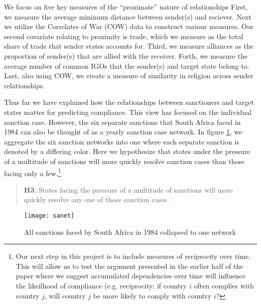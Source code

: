 We focus on five key measures of the ``proximate'' nature of relationships First, we measure the average minimum distance between sender(s) and reciever. Next we utilize the Correlates of War (COW) data to construct variour measures. Our second covariate relating to proximity is trade, which we measure as the total share of trade that sender states accounts for. Third, we measure alliances as the proportion of sender(s) that are allied with the receiver. Forth, we measure the average number of common IGOs that the sender(s) and target state belong to. Last, also using COW, we create a measure of similarity in religion across sender relationships.
  
Thus far we have explained how the relationships between sanctioners and target states matter for predicting compliance. This view has focused on the individual sanction case. However, the six separate sanctions that South Africa faced in 1984 can also be thought of as a yearly sanction case network. In figure \ref{fig:sanet}, we aggregate the six sanction networks into one where each separate sanction is denoted by a differing color. Here we hypothesize that states under the pressure of a multitude of sanctions will more quickly resolve sanction cases than those facing only a few.\footnote{Our next step in this project is to include measures of reciprocity over time. This will allow us to test the argument presented in the earlier half of the paper where we suggest accumulated dependencies over time will influence the likeilhood of compliance (e.g. reciprocity: if country $i$ often complies with country $j$, will country $j$ be more likely to comply with country $i$?}

\begin{quote}
	\textbf{H3}: States facing the pressure of a multitude of sanctions will more quickly resolve any one of those sanction cases.
\end{quote}

\begin{figure}[ht]
	\centering
	\texttt{[image: sanet]}
	\caption{All sanctions faced by South Africa in 1984 collapsed to one network}
	\label{fig:sanet}
\end{figure}
\FloatBarrier